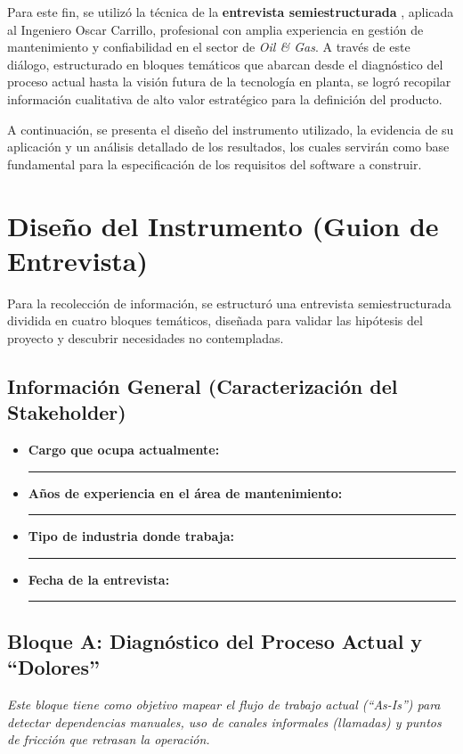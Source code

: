 \documentclass[12pt, a4paper]{article}
\begin{document}
Para este fin, se utilizó la técnica de la \textbf{entrevista semiestructurada} \parencite{sena:fundamentos2024}, aplicada al Ingeniero Oscar Carrillo, profesional con amplia experiencia en gestión de mantenimiento y confiabilidad en el sector de \textit{Oil \& Gas}. A través de este diálogo, estructurado en bloques temáticos que abarcan desde el diagnóstico del proceso actual hasta la visión futura de la tecnología en planta, se logró recopilar información cualitativa de alto valor estratégico para la definición del producto.

A continuación, se presenta el diseño del instrumento utilizado, la evidencia de su aplicación y un análisis detallado de los resultados, los cuales servirán como base fundamental para la especificación de los requisitos del software a construir.

\section{Diseño del Instrumento (Guion de Entrevista)}

Para la recolección de información, se estructuró una entrevista semiestructurada dividida en cuatro bloques temáticos, diseñada para validar las hipótesis del proyecto y descubrir necesidades no contempladas.

\subsection{Información General (Caracterización del Stakeholder)}

\begin{itemize}
    \item \textbf{Cargo que ocupa actualmente:} \rule{5cm}{0.4pt}
    \item \textbf{Años de experiencia en el área de mantenimiento:} \rule{5cm}{0.4pt}
    \item \textbf{Tipo de industria donde trabaja:} \rule{5cm}{0.4pt}
    \item \textbf{Fecha de la entrevista:} \rule{5cm}{0.4pt}
\end{itemize}

\subsection{Bloque A: Diagnóstico del Proceso Actual y ``Dolores''}

\textit{Este bloque tiene como objetivo mapear el flujo de trabajo actual (``As-Is'') para detectar dependencias manuales, uso de canales informales (llamadas) y puntos de fricción que retrasan la operación.}
\end{document}
